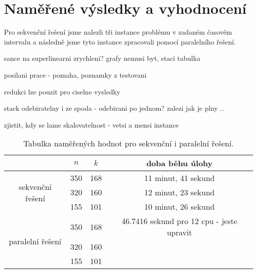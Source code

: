 \documentclass[12pt]{article}
\begin{document}

\section{Naměřené výsledky a vyhodnocení}


Pro sekvenční řešení jsme nalezli tři instance problému v zadaném časovém intervalu a 
následně jsme tyto instance zpracovali pomocí paralelního řešení.

sance na superlinearni zrychleni?
grafy nemusi byt, staci tabulka


posilani prace - pomaha, poznamky z testovani

redukci lze pouzit pro ciselne vysledky

stack odebiratelny i ze spoda - odebirani po jednom? zalezi jak je plny .. 


zjistit, kdy se lame skalovatelnost - vetsi a mensi instance


\begin{table}[ht]
  \begin{center}
    \begin{tabular}{| c | c | c | c |}
      \cline{2-4}
                 \multicolumn{1}{c|}{} & $n$ & $k$ & doba běhu úlohy \\ \hline
     \multirow{3}{*}{sekvenční řešení} & 350 & 168 & 11 minut, 41 sekund \\ 
                                       & 320 & 160 & 12 minut, 23 sekund \\ 
                                       & 155 & 101 & 10 minut, 26 sekund \\ \hline
     \multirow{3}{*}{paralelní řešení} & 350 & 168 & 46.7416 sekund pro 12 cpu - jeste upravit\\
                                       & 320 & 160 & \\
                                       & 155 & 101 & \\
      \hline
    \end{tabular}
    \caption{Tabulka naměřených hodnot pro sekvenční i paralelní řešení.}
  \end{center}
\end{table}
\end{document}
